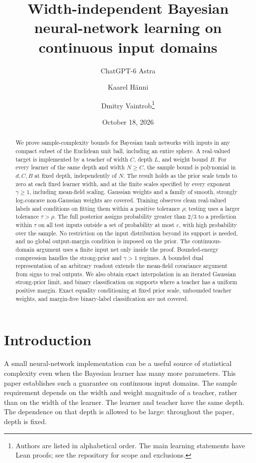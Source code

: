 \documentclass[11pt]{article}
\title{Width-independent Bayesian neural-network learning on continuous input domains}
\author{ChatGPT-6 Astra \and Kaarel H\"anni \and Dmitry Vaintrob\thanks{Authors are listed in alphabetical order. The main learning statements have Lean proofs; see the repository for scope and exclusions.}}
\date{October 18, 2026}
\theoremstyle{remark}\newtheorem{remark}[theorem]{Remark}
\begin{document}
\maketitle
\begin{abstract}
We prove sample-complexity bounds for Bayesian tanh networks with inputs in
any compact subset of the Euclidean unit ball, including an entire sphere.
A real-valued target is implemented by a teacher of width $C$, depth $L$,
and weight bound $B$. For every learner of the same depth and width
$N\geq C$, the sample bound
is polynomial in $d,C,B$ at fixed depth, independently of $N$.
The result holds as the prior scale tends to zero at each fixed learner
width, and at the finite scales specified by every exponent
$\gamma\geq1$, including mean-field scaling. Gaussian weights
and a family of smooth, strongly log-concave non-Gaussian weights are covered.
Training observes clean real-valued labels and conditions on fitting them
within a positive tolerance $\rho$; testing uses a larger tolerance
$\tau>\rho$. The full posterior assigns probability greater than $2/3$
to a prediction within $\tau$ on all test inputs outside a set of
probability at most $\varepsilon$, with high probability over the sample. No restriction
on the input distribution beyond its support is needed, and no global
output-margin condition is imposed on the prior.
The continuous-domain argument uses a finite input net only inside the
proof. Bounded-energy compression handles the strong-prior and
$\gamma>1$ regimes. A bounded dual representation of an arbitrary readout
extends the mean-field covariance argument from signs to real outputs.
We also obtain exact interpolation in an iterated Gaussian strong-prior
limit, and binary classification on supports where a teacher has a
uniform positive margin. Exact equality conditioning at fixed prior scale,
unbounded teacher weights, and margin-free binary-label classification
are not covered.
\end{abstract}

\section{Introduction}
A small neural-network implementation can be a useful source of statistical
complexity even when the Bayesian learner has many more parameters. This
paper establishes such a guarantee on continuous input domains. The sample
requirement depends on the width and weight magnitude of a teacher, rather
than on the width of the learner. The learner and teacher have the same
depth. The dependence on that depth is allowed to be large: throughout
the paper, depth is fixed.
\end{document}

